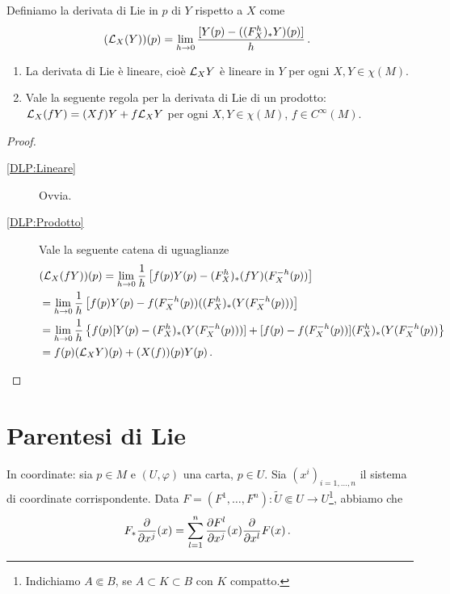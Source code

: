 \begin{definition}
	Definiamo la derivata di Lie in $p$ di $Y$ rispetto a $X$ come \begin{equation*}(\mathcal L_X(Y))(p)=\lim_{h\to 0}\frac{[Y(p)-((F_X^h)_*Y)(p)]}h \, \text{. }
	\end{equation*}
\end{definition}

\begin{proposition} \label{prop:DerLieProprieta}
	\begin{enumerate}
		\item La derivata di Lie è lineare, cioè $\mathcal L_XY$ è lineare in $Y$ per ogni $X,Y\in\chi(M)$. \label{DLP:Lineare}
		\item Vale la seguente regola per la derivata di Lie di un prodotto: $\mathcal L_X(fY)=(Xf)Y+f\mathcal L_XY$ per ogni $X,Y\in\chi(M)$, $f\in C^\infty(M)$. \label{DLP:Prodotto}
	\end{enumerate}
\end{proposition}

\begin{proof}
	\begin{description}
	 \item [\ref{DLP:Lineare}] Ovvia.
	 \item [\ref{DLP:Prodotto}] Vale la seguente catena di uguaglianze
	 \begin{equation*}
	 \begin{split}
	 &(\mathcal L_X(fY))(p)=\lim_{h\to 0} \frac 1h \left[f(p)Y(p)-(F_X^h)_*(fY)(F_X^{-h}(p))\right]\\
	 &=\lim_{h\to 0}\frac 1h \left[f(p)Y(p)-f(F_X^{-h}(p)) ((F_X^h)_*(Y(F_X^{-h}(p)))\right]\\
	 &=\lim_{h\to 0}\frac 1h \left\{f(p)[Y(p)-(F_X^h)_*(Y(F_X^{-h}(p)))]+[f(p)-f(F_X^{-h}(p))](F_X^h)_*(Y(F_X^{-h}(p))\right\}\\
	 &=f(p)(\mathcal L_XY)(p)+(X(f))(p)Y(p) \, \text{. }
	 \end{split}
	 \end{equation*}
	 \end{description}
\end{proof}


\section{Parentesi di Lie}

In coordinate: sia $p\in M$ e $(U,\varphi)$ una carta, $p\in U$. Sia $(x^i)_{i=1,\ldots,n}$ il sistema di coordinate corrispondente.
Data $F=(F^1,\ldots,F^n):\tilde U \Subset U \to U$\footnote{Indichiamo $A\Subset B$, se $A\subset K \subset B$ con $K$ compatto.}, abbiamo che \begin{equation*}
	F_*\frac\partial{\partial x^j}(x)=\sum_{l=1}^n \frac{\partial F^l}{\partial x^j}(x)\frac\partial{\partial x^l}F(x)\, \text{. }
\end{equation*}

